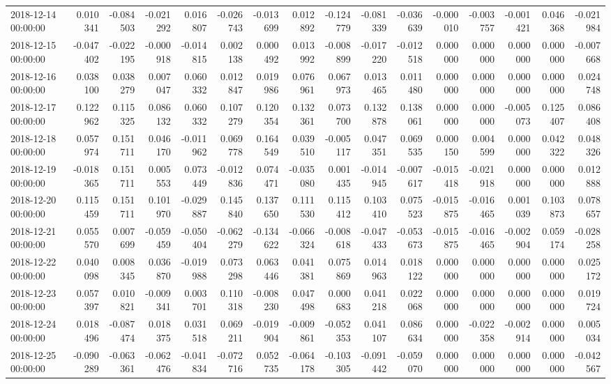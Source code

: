 \begin{tabular}{lrrrrrrrrrrrrrrr}
2018-12-14 00:00:00 & 0.010341 & -0.084503 & -0.021292 & 0.016807 & -0.026743 & -0.013699 & 0.012892 & -0.124779 & -0.081339 & -0.036639 & -0.000010 & -0.003757 & -0.001421 & 0.046368 & -0.021984 \\
2018-12-15 00:00:00 & -0.047402 & -0.022195 & -0.000918 & -0.014815 & 0.002138 & 0.000492 & 0.013992 & -0.008899 & -0.017220 & -0.012518 & 0.000000 & 0.000000 & 0.000000 & 0.000000 & -0.007668 \\
2018-12-16 00:00:00 & 0.038100 & 0.038279 & 0.007047 & 0.060332 & 0.012847 & 0.019986 & 0.076961 & 0.067973 & 0.013465 & 0.011480 & 0.000000 & 0.000000 & 0.000000 & 0.000000 & 0.024748 \\
2018-12-17 00:00:00 & 0.122962 & 0.115325 & 0.086132 & 0.060332 & 0.107279 & 0.120354 & 0.132361 & 0.073700 & 0.132878 & 0.138061 & 0.000000 & 0.000000 & -0.005073 & 0.125407 & 0.086408 \\
2018-12-18 00:00:00 & 0.057974 & 0.151711 & 0.046170 & -0.011962 & 0.069778 & 0.164549 & 0.039510 & -0.005117 & 0.047351 & 0.069535 & 0.000150 & 0.004599 & 0.000000 & 0.042322 & 0.048326 \\
2018-12-19 00:00:00 & -0.018365 & 0.151711 & 0.005553 & 0.073449 & -0.012836 & 0.074471 & -0.035080 & 0.001435 & -0.014945 & -0.007617 & -0.015418 & -0.021918 & 0.000000 & 0.000000 & 0.012888 \\
2018-12-20 00:00:00 & 0.115459 & 0.151711 & 0.101970 & -0.029887 & 0.145840 & 0.137650 & 0.111530 & 0.115412 & 0.103410 & 0.075523 & -0.015875 & -0.016465 & 0.001039 & 0.103873 & 0.078657 \\
2018-12-21 00:00:00 & 0.055570 & 0.007699 & -0.059459 & -0.050404 & -0.062279 & -0.134622 & -0.066324 & -0.008618 & -0.047433 & -0.053673 & -0.015875 & -0.016465 & -0.002904 & 0.059174 & -0.028258 \\
2018-12-22 00:00:00 & 0.040098 & 0.008345 & 0.036870 & -0.019988 & 0.073298 & 0.063446 & 0.041381 & 0.075869 & 0.014963 & 0.018122 & 0.000000 & 0.000000 & 0.000000 & 0.000000 & 0.025172 \\
2018-12-23 00:00:00 & 0.057397 & 0.010821 & -0.009341 & 0.003701 & 0.110318 & -0.008230 & 0.047498 & 0.000683 & 0.041218 & 0.022068 & 0.000000 & 0.000000 & 0.000000 & 0.000000 & 0.019724 \\
2018-12-24 00:00:00 & 0.018496 & -0.087474 & 0.018375 & 0.031518 & 0.069211 & -0.019904 & -0.009861 & -0.052353 & 0.041107 & 0.086634 & 0.000000 & -0.022358 & -0.002914 & 0.000000 & 0.005034 \\
2018-12-25 00:00:00 & -0.090289 & -0.063361 & -0.062476 & -0.041834 & -0.072716 & 0.052735 & -0.064178 & -0.103305 & -0.091442 & -0.059070 & 0.000000 & 0.000000 & 0.000000 & 0.000000 & -0.042567 \\

\end{tabular}
